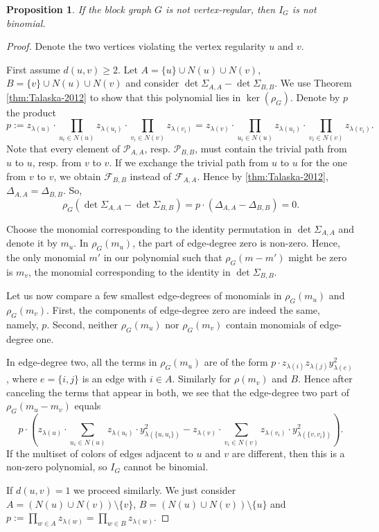 \documentclass[a4paper, 11pt]{amsart}
\numberwithin{theorem}{section}
\newtheorem{proposition}[theorem]{Proposition}
\def\P{{\mathcal P}}
\def\F{{\mathcal F}}
\begin{document}
\begin{proposition} \label{prop:Vertex}
    If the block graph $G$ is not vertex-regular, then $I_G$ is not binomial.
\end{proposition}
\begin{proof}
    Denote the two vertices violating the vertex regularity $u$ and $v$. 
    
    First assume $d(u,v)\geq 2$. Let $A = \lbrace u\rbrace\cup N(u)\cup N(v)$, $B = \lbrace v\rbrace\cup N(u)\cup N(v)$ and consider $\det\Sigma_{A,A}-\det\Sigma_{B,B}$.
    We use Theorem \ref{thm:Talaska-2012} to show that this polynomial
    lies in $\ker(\rho_G)$. Denote by $p$ the product 
    $$
        p := z_{\lambda(u)}\cdot\prod_{u_i\in N(u)}z_{\lambda(u_i)}\cdot \prod_{v_i\in N(v)}z_{\lambda(v_i)}=
        z_{\lambda(v)}\cdot \prod_{u_i\in N(u)}z_{\lambda(u_i)}\cdot\prod_{v_i\in N(v)}z_{\lambda(v_i)}.
    $$
    Note that every element of $\P_{A,A}$, resp. $\P_{B,B}$, must contain the trivial path from $u$ to $u$, resp. from $v$ to $v$. If we exchange the trivial path from $u$ to $u$ for the one from $v$ to $v$, we obtain $\F_{B,B}$ instead of $\F_{A,A}$. Hence by \ref{thm:Talaska-2012}, $\Delta_{A,A} = \Delta_{B,B}$. So,
    $$
        \rho_G(\det \Sigma_{A,A} - \det\Sigma_{B,B}) = p\cdot (\Delta_{A,A}-\Delta_{B,B}) = 0.
    $$

    Choose the monomial corresponding to the identity permutation in
    $\det\Sigma_{A,A}$ and denote it by $m_u$. In $\rho_G(m_u)$, the
    part of edge-degree zero is non-zero. Hence, the only monomial $m'$
    in our polynomial such that $\rho_G(m-m')$ might be zero is $m_v$,
    the monomial corresponding to the identity in $\det\Sigma_{B,B}$.

    Let us now compare a few smallest edge-degrees of monomials in
    $\rho_G(m_u)$ and $\rho_G(m_v)$. First, the components of 
    edge-degree zero are indeed the same, namely, $p$. Second, neither 
    $\rho_G(m_u)$ nor $\rho_G(m_v)$ contain monomials of edge-degree
    one. 

    In edge-degree two, all the terms in $\rho_G(m_u)$ are of the form
    $p\cdot z_{\lambda(i)}z_{\lambda(j)} y_{\lambda (e)}^2$, where
    $e=\{i,j\}$ is an edge with $i\in A$. Similarly for $\rho(m_v)$
    and $B$. Hence after canceling the terms that appear in both, we
    see that the edge-degree two part of
    $\rho_G(m_u - m_v)$ equals 
    $$
        p\cdot\left(z_{\lambda(u)}\cdot\sum_{u_i\in N(u)}
	z_{\lambda(u_i)}\cdot y_{\lambda(\{u,u_i\})}^2 -
	z_{\lambda(v)}\cdot \sum_{v_i\in N(v)} z_{\lambda(v_i)}\cdot
	y_{\lambda(\{v,v_i\})}^2\right).
    $$ 
    If the multiset of colors of edges adjacent to $u$ and $v$ are
    different, then this is a non-zero polynomial, so $I_G$ cannot be
    binomial.

    If $d(u,v) = 1$ we proceed similarly. We just consider $A = (N(u)\cup N(v))\setminus \lbrace v\rbrace$, $B = (N(u)\cup N(v))\setminus \lbrace u\rbrace$ and $p:= \prod_{w\in A}z_{\lambda (w)} = \prod_{w\in B}z_{\lambda (w)}$.
\end{proof}
\end{document}
